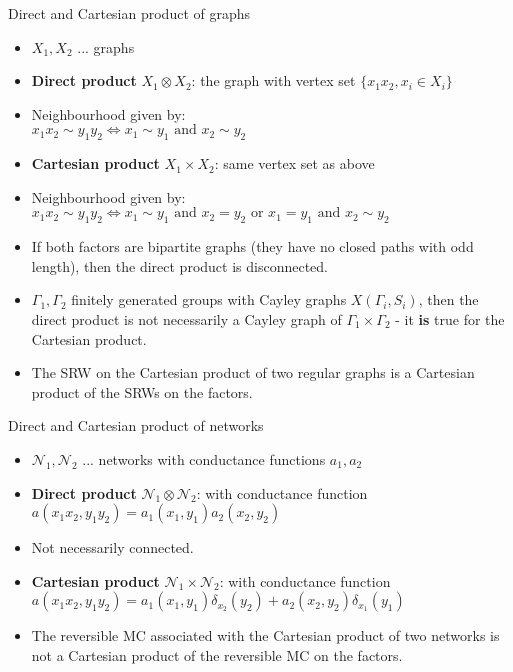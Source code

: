\documentclass{beamer}\usepackage[]{graphicx}\usepackage[]{color}
\begin{document}
\begin{frame}[fragile]{Direct and Cartesian product of graphs}
\begin{itemize}
\item $X_1, X_2$ ... graphs
\item \textbf{Direct product} $X_1 \otimes X_2$: the graph with vertex set $\{x_1x_2, x_i \in X_i\}$
\item Neighbourhood given by: \\
$x_1 x_2 \sim y_1 y_2 \iff x_1\sim y_1 \text{ and } x_2 \sim y_2$
\item \textbf{Cartesian product} $X_1 \times X_2$: same vertex set as above
\item Neighbourhood given by: $x_1 x_2 \sim y_1 y_2 \iff x_1\sim y_1 \text{ and } x_2 = y_2 \text{ or } x_1 = y_1 \text{ and } x_2 \sim y_2$
\item If both factors are bipartite graphs (they have no closed paths with odd length), then the direct product is disconnected.
\item $\Gamma_1, \Gamma_2$ finitely generated groups with Cayley graphs $X(\Gamma_i, S_i)$, then the direct product is not necessarily a Cayley graph of $\Gamma_1 \times \Gamma_2$ - it \textbf{is} true for the Cartesian product.
\item The SRW on the Cartesian product of two regular graphs is a Cartesian product of the SRWs on the factors.
\end{itemize}
\end{frame}

\begin{frame}[fragile]{Direct and Cartesian product of networks}
\begin{itemize}
\item $\mathcal{N}_1, \mathcal{N}_2$ ... networks with conductance functions $a_1, a_2$
\item \textbf{Direct product} $\mathcal{N}_1 \otimes \mathcal{N}_2$: with conductance function\\
$a(x_1 x_2, y_1 y_2) =  a_1(x_1, y_1)a_2(x_2, y_2)$
\item Not necessarily connected.
\item \textbf{Cartesian product} $\mathcal{N}_1 \times \mathcal{N}_2$: with conductance function\\
$a(x_1 x_2, y_1 y_2) =  a_1(x_1, y_1)\delta_{x_2}(y_2) + a_2(x_2, y_2)\delta_{x_1}(y_1)$
\item The reversible MC associated with the Cartesian product of two networks is not a Cartesian product of the reversible MC on the factors.
\end{itemize}
\end{frame}
\end{document}

